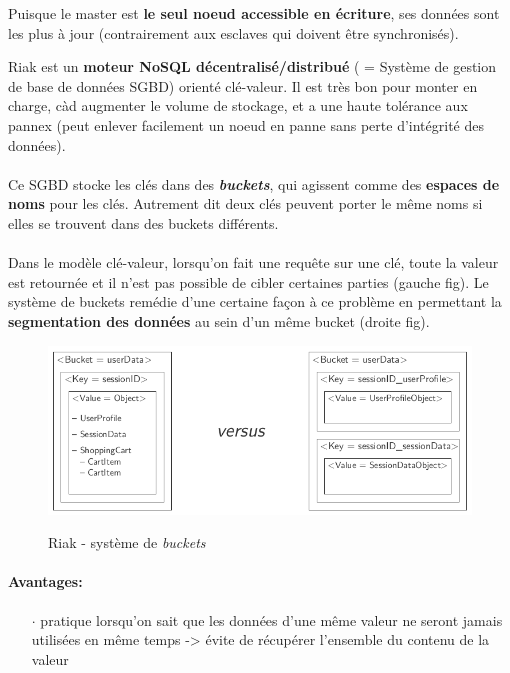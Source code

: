 \item{}
{\vrai}
{Puisque le master est \textbf{le seul noeud accessible en écriture}, ses données sont les plus à jour (contrairement aux esclaves qui doivent être synchronisés).}


\item{}
{}
{Riak est un \textbf{moteur NoSQL décentralisé/distribué} ( = Système de gestion de base de données SGBD) orienté clé-valeur. Il est très bon pour monter en charge, càd augmenter le volume de stockage, et a une haute tolérance aux pannex (peut enlever facilement un noeud en panne sans perte d'intégrité des données).
\paragraph{}
Ce SGBD stocke les clés dans des \textit{\textbf{buckets}}, qui agissent comme des \textbf{espaces de noms} pour les clés. Autrement dit deux clés peuvent porter le même noms si elles se trouvent dans des buckets différents.
\paragraph{}
Dans le modèle clé-valeur, lorsqu'on fait une requête sur une clé, toute la valeur est retournée et il n'est pas possible de cibler certaines parties (gauche fig\cite{fig-riak}). Le système de buckets remédie d'une certaine façon à ce problème en permettant la \textbf{segmentation des données} au sein d'un même bucket (droite fig\cite{fig-riak}). 


\begin{figure}[h!]
\center\includegraphics[scale=.3]{images/riak-bucket}
\label{fig-riak}
\caption{Riak - système de \textit{buckets} \cite{ref1}}
\end{figure}

\paragraph{Avantages:}
\begin{itemize}
\item[$\cdot$]pratique lorsqu'on sait que les données d'une même valeur ne seront jamais utilisées en même temps -> évite de récupérer l'ensemble du contenu de la valeur
\end{itemize}
}


